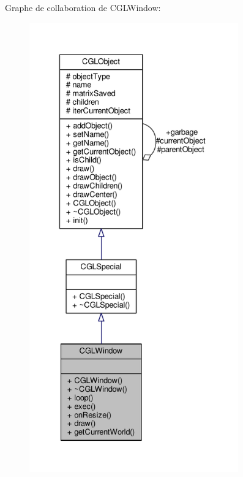 Graphe de collaboration de C\-G\-L\-Window\-:\nopagebreak
\begin{figure}[H]
\begin{center}
\leavevmode
\includegraphics[height=550pt]{dc/d6d/class_c_g_l_window__coll__graph}
\end{center}
\end{figure}
